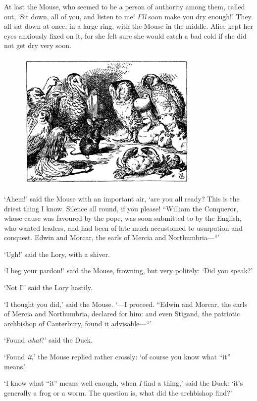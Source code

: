 \documentclass[12pt,openany]{memoir}
\begin{document}
At last the Mouse, who seemed to be a person of authority among them, called out, `Sit down, all of you, and listen to me! \textit{I'll} soon make you dry enough!' They all sat down at once, in a large ring, with the Mouse in the middle. Alice kept her eyes anxiously fixed on it, for she felt sure she would catch a bad cold if she did not get dry very soon.

\begin{figure}[b]
  \centering
  \includegraphics[width=0.8\textwidth]{illustrations/pic_09.jpg}
\end{figure}

`Ahem!' said the Mouse with an important air, `are you all ready? This is the driest thing I know. Silence all round, if you please! ``William the Conqueror, whose cause was favoured by the pope, was soon submitted to by the English, who wanted leaders, and had been of late much accustomed to usurpation and conquest. Edwin and Morcar, the earls of Mercia and Northumbria---``'

`Ugh!' said the Lory, with a shiver.

`I beg your pardon!' said the Mouse, frowning, but very politely: `Did you speak?'

`Not I!' said the Lory hastily.

`I thought you did,' said the Mouse. `---I proceed. ``Edwin and Morcar, the earls of Mercia and Northumbria, declared for him: and even Stigand, the patriotic archbishop of Canterbury, found it advisable---``'

`Found \textit{what}?' said the Duck.

`Found \textit{it},' the Mouse replied rather crossly: `of course you know what ``it'' means.'

`I know what ``it'' means well enough, when \textit{I} find a thing,' said the Duck: `it's generally a frog or a worm. The question is, what did the archbishop find?'
\end{document}
